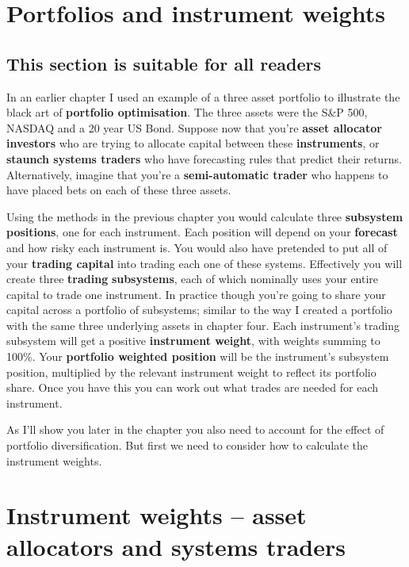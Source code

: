 \section*{Portfolios and instrument weights}  {}

\subsection*{This section is suitable for all readers}

In an earlier chapter I used an example of a three asset portfolio to illustrate the black art of \textbf{portfolio optimisation}. The three assets were the S\&P 500, NASDAQ and a 20 year US Bond. Suppose now that you're \textbf{asset allocator investors} who are trying to allocate capital between these \textbf{instruments}, or \textbf{staunch systems traders} who have forecasting rules that predict their returns. Alternatively, imagine that you're a \textbf{semi-automatic trader} who happens to have placed bets on each of these three assets.

Using the methods in the previous chapter you would calculate three \textbf{subsystem positions}, one for each instrument. Each position will depend on your \textbf{forecast} and how risky each instrument is. You would also have pretended to put all of your \textbf{trading capital} into trading each one of these systems. Effectively you will create three \textbf{trading} \textbf{subsystems}, each of which nominally uses your entire capital to trade one instrument.
In practice though you're going to share your capital across a portfolio of subsystems; similar to the way I created a portfolio with the same three underlying assets in chapter four. Each instrument's trading subsystem will get a positive \textbf{instrument weight}, with weights summing to 100\%. Your \textbf{portfolio weighted position} will be the instrument's subsystem position, multiplied by the relevant instrument weight to reflect its portfolio share. Once you have this you can work out what trades are needed for each instrument.

As I'll show you later in the chapter you also need to account for the effect of portfolio diversification. But first we need to consider how to calculate the instrument weights.

\section*{Instrument weights -- asset allocators and systems traders}  {}

